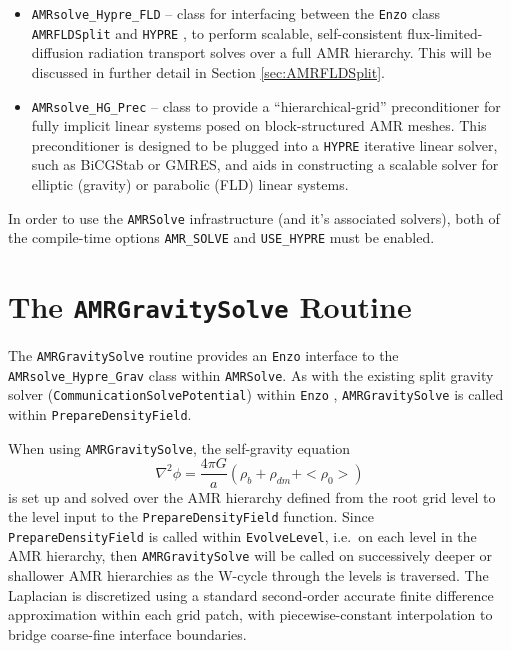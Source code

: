 \documentclass[letterpaper,10pt]{article}
\renewcommand{\(}{\left(}
\renewcommand{\)}{\right)}
\newcommand{\amrsolve}{{\tt AMRSolve} }
\newcommand{\enzo}{{\tt Enzo} }
\newcommand{\hypre}{{\tt HYPRE} }
\begin{document}
\begin{itemize}
  \enzo routine {\tt AMRGravitySolve} and \hypre, to perform scalable,
  self-consistent self-gravity solves over a full AMR hierarchy.  This
  will be discussed in further detail in Section
  \ref{sec:AMRGravitySolve}.
\item {\tt AMRsolve\_Hypre\_FLD} -- class for interfacing between the
  \enzo class {\tt AMRFLDSplit} and \hypre, to perform scalable,
  self-consistent flux-limited-diffusion radiation transport solves
  over a full AMR hierarchy.  This will be discussed in further detail
  in Section \ref{sec:AMRFLDSplit}.
\item {\tt AMRsolve\_HG\_Prec} -- class to provide a
  ``hierarchical-grid'' preconditioner for fully implicit linear
  systems posed on block-structured AMR meshes.  This preconditioner
  is designed to be plugged into a \hypre iterative linear solver,
  such as BiCGStab or GMRES, and aids in constructing a scalable
  solver for elliptic (gravity) or parabolic (FLD) linear systems.
\end{itemize}
In order to use the \amrsolve infrastructure (and it's associated
solvers), both of the compile-time options {\tt AMR\_SOLVE} and 
{\tt USE\_HYPRE} must be enabled.


\section{The {\tt AMRGravitySolve} Routine}
\label{sec:AMRGravitySolve}

The {\tt AMRGravitySolve} routine provides an \enzo interface to the
{\tt AMRsolve\_Hypre\_Grav} class within {\tt AMRSolve}.  As with the
existing split gravity solver ({\tt CommunicationSolvePotential})
within \enzo, {\tt AMRGravitySolve} is called within 
{\tt PrepareDensityField}.

When using {\tt AMRGravitySolve}, the self-gravity equation
\begin{equation}
\label{eq:self_gravity}
  \nabla^2 \phi = \frac{4\pi G}{a}(\rho_b + \rho_{dm} + <\!\!\rho_0\!\!>)
\end{equation}
is set up and solved over the AMR hierarchy defined from the root grid
level to the level input to the {\tt PrepareDensityField} function.
Since {\tt PrepareDensityField} is called within {\tt EvolveLevel},
i.e.~on each level in the AMR hierarchy, then {\tt AMRGravitySolve}
will be called on successively deeper or shallower AMR hierarchies as
the W-cycle through the levels is traversed.  The Laplacian is
discretized using a standard second-order accurate finite difference
approximation within each grid patch, with piecewise-constant
interpolation to bridge coarse-fine interface boundaries.
\end{document}
